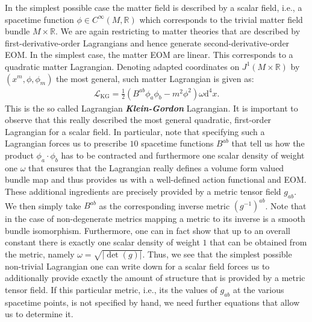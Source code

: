 In the simplest possible case the matter field is described by a scalar field, i.e., a spacetime function $\phi \in C^{\infty}(M,\mathbb{R})$ which corresponds to the trivial matter field bundle $M \times \mathbb{R}$. We are again restricting to matter theories that are described by first-derivative-order Lagrangians and hence generate second-derivative-order EOM. In the simplest case, the matter EOM are linear. This corresponds to a quadratic matter Lagrangian. Denoting adapted coordinates on $J^1(M \times \mathbb{R})$ by $(x^m,\phi,\phi_m)$ the most general, such matter Lagrangian is given as:
\begin{align}\label{KGL}
    \mathcal{L}_{\text{KG}} = \frac{1}{2} \left ( B^{ab} \phi_a \phi_b - m^2 \phi^2\right )\omega \mathrm{d}^4x.
\end{align}
This is the so called Lagrangian \textit{\textbf{Klein-Gordon}} Lagrangian. It is important to observe that this really described the most general quadratic, first-order Lagrangian for a scalar field. 
In particular, note that specifying such a Lagrangian forces us to prescribe $10$ spacetime functions $B^{ab}$ that tell us how the product $\phi_a\cdot \phi_b$ has to be contracted and furthermore one scalar density of weight one $\omega$ that ensures that the Lagrangian really defines a volume form valued bundle map and thus provides us with a well-defined action functional and EOM.
These additional ingredients are precisely provided by a metric tensor field $g_{ab}$. We then simply take $B^{ab}$ as the corresponding inverse metric $(g^{-1})^{ab}$. Note that in the case of non-degenerate metrics mapping a metric to its inverse is a smooth bundle isomorphism. Furthermore, one can in fact show that up to an overall constant there is exactly one scalar density of weight $1$ that can be obtained from the metric, namely $\omega = \sqrt{ \vert \operatorname{det}(g) \vert }$. 
Thus, we see that the simplest possible non-trivial Lagrangian one can write down for a scalar field forces us to additionally provide exactly the amount of structure that is provided by a metric tensor field. If this particular metric, i.e., its the values of $g_{ab}$ at the various spacetime points, is not specified by hand, we need further equations that allow us to determine it.  

